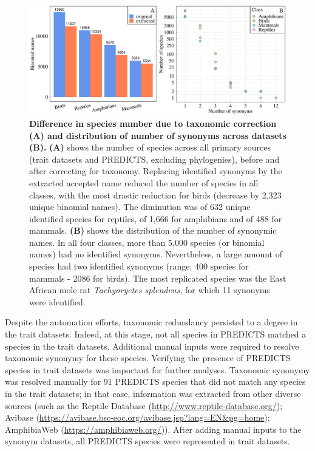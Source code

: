 \vspace{0.5cm}
\begin{figure}[h!]
\includegraphics[scale=0.45]{figures/chapter2/Taxonomic_corrections/tax_corrections}
\caption[Difference in species number due to taxonomic correction (A) and distribution of number of synonyms across datasets (B)]{\textbf{Difference in species number due to taxonomic correction (A) and distribution of number of synonyms across datasets (B).} \textbf{(A)} shows the number of species across all primary sources (trait datasets and PREDICTS, excluding phylogenies), before and after correcting for taxonomy. Replacing identified synonyms by the extracted accepted name reduced the number of species in all classes, with the most drastic reduction for birds (decrease by 2,323 unique binomial names). The diminution was of 632 unique identified species for reptiles, of 1,666 for amphibians and of 488 for mammals. \textbf{(B)} shows the distribution of the number of synonymic names. In all four classes, more than 5,000 species (or binomial names) had no identified synonyms. Nevertheless, a large amount of species had two identified synonyms (range: 400 species for mammals - 2086 for birds). The most replicated species was the East African mole rat \textit{Tachyoryctes splendens}, for which 11 synonyms were identified.}
\label{taxcor}
\end{figure}

Despite the automation efforts, taxonomic redundancy persisted to a degree in the trait datasets. Indeed, at this stage, not all species in PREDICTS matched a species in the trait datasets. Additional manual inputs were required to resolve taxonomic synonymy for these species. Verifying the presence of PREDICTS species in trait datasets was important for further analyses. Taxonomic synonymy was resolved manually for 91 PREDICTS species that did not match any species in the trait datasets; in that case, information was extracted from other diverse sources (such as the Reptile Database (\url{http://www.reptile-database.org/}); Avibase (\url{https://avibase.bsc-eoc.org/avibase.jsp?lang=EN&pg=home}); AmphibiaWeb (\url{https://amphibiaweb.org/})). After adding manual inputs to the synonym datasets, all PREDICTS species were represented in trait datasets. 

